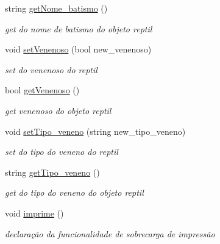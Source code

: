 \begin{DoxyCompactItemize}
string \mbox{\hyperlink{class_reptil_aaff178bb8919c1cae9f205bbba3c46cc}{get\+Nome\+\_\+batismo}} ()
\begin{DoxyCompactList}\small\item\em get do nome de batismo do objeto reptil \end{DoxyCompactList}\item 
void \mbox{\hyperlink{class_reptil_aad9caa07677609d1c6594b71e1d55747}{set\+Venenoso}} (bool new\+\_\+venenoso)
\begin{DoxyCompactList}\small\item\em set do venenoso do reptil \end{DoxyCompactList}\item 
bool \mbox{\hyperlink{class_reptil_a75138aaa91420a9f82ddd39c19ea8b78}{get\+Venenoso}} ()
\begin{DoxyCompactList}\small\item\em get venenoso do objeto reptil \end{DoxyCompactList}\item 
void \mbox{\hyperlink{class_reptil_a4ee801df6442082d813b37e2ad6f65fa}{set\+Tipo\+\_\+veneno}} (string new\+\_\+tipo\+\_\+veneno)
\begin{DoxyCompactList}\small\item\em set do tipo do veneno do reptil \end{DoxyCompactList}\item 
string \mbox{\hyperlink{class_reptil_a34a5f947f8e81c25bc4302075ff92c85}{get\+Tipo\+\_\+veneno}} ()
\begin{DoxyCompactList}\small\item\em get do tipo do veneno do objeto reptil \end{DoxyCompactList}\item 
\mbox{\label{class_reptil_a6220f80eff8e58d1ccba293c97fb5dab}} 
void \mbox{\hyperlink{class_reptil_a6220f80eff8e58d1ccba293c97fb5dab}{imprime}} ()
\begin{DoxyCompactList}\small\item\em declaração da funcionalidade de sobrecarga de impressão \end{DoxyCompactList}\end{DoxyCompactItemize}
